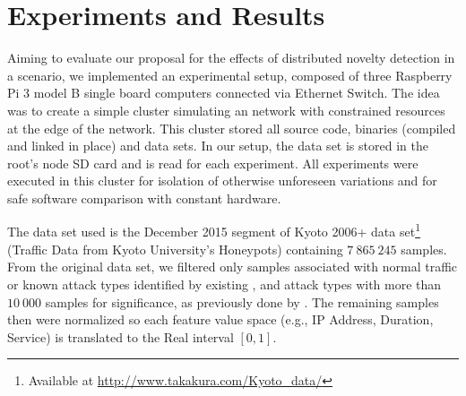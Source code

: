 
\section{Experiments and Results}
\label{sec:experiments}


Aiming to evaluate our proposal for the effects of distributed novelty detection
in a \iot \nids scenario, we implemented an experimental setup, composed of three Raspberry Pi 3 model B single board
computers connected via Ethernet Switch. The idea was to create a simple cluster simulating an
\iot network with constrained resources at the edge of the network.
This cluster stored all source code, binaries (compiled and linked in place) and
data sets.
In our setup, the data set is stored in the root's node SD card and is read for
each experiment.
All experiments were executed in this cluster for isolation of otherwise
unforeseen variations and for safe software comparison with constant hardware.

The data set used is the December 2015 segment of
Kyoto 2006+ data set\footnote{Available at \url{http://www.takakura.com/Kyoto\_data/}}
(Traffic Data from Kyoto University's Honeypots) \cite{Song2011}
containing $7\:865\:245$ samples.
From the original data set, we filtered only samples associated with normal traffic
or known attack types identified by existing \nids, and attack types with more
than $10\:000$ samples for significance, as previously done by
\cite{Cassales2019a}.
The remaining samples then were normalized so each feature value space (e.g., IP
Address, Duration, Service) is translated to the Real interval $[0, 1]$.


